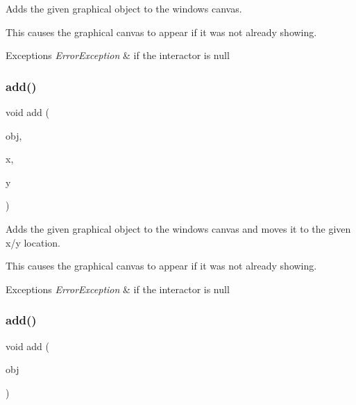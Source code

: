 Adds the given graphical object to the window\textquotesingle{}s canvas. 

This causes the graphical canvas to appear if it was not already showing. 
\begin{DoxyExceptions}{Exceptions}
{\em Error\+Exception} & if the interactor is null \\
\hline
\end{DoxyExceptions}
\mbox{\label{classsgl_1_1GWindow_ab5388ece7a50b46e0ee72e11fe202609}} 
\subsubsection{\texorpdfstring{add()}{add()}\hspace{0.1cm}{\footnotesize\ttfamily [6/8]}}
{\footnotesize\ttfamily void add (\begin{DoxyParamCaption}\item[{\mbox{\hyperlink{classsgl_1_1GObject}{G\+Object}} $\ast$}]{obj,  }\item[{double}]{x,  }\item[{double}]{y }\end{DoxyParamCaption})\hspace{0.3cm}{\ttfamily [virtual]}}



Adds the given graphical object to the window\textquotesingle{}s canvas and moves it to the given x/y location. 

This causes the graphical canvas to appear if it was not already showing. 
\begin{DoxyExceptions}{Exceptions}
{\em Error\+Exception} & if the interactor is null \\
\hline
\end{DoxyExceptions}
\mbox{\label{classsgl_1_1GWindow_a7f596867e2d8f9dfb816b3d496ea074f}} 
\subsubsection{\texorpdfstring{add()}{add()}\hspace{0.1cm}{\footnotesize\ttfamily [7/8]}}
{\footnotesize\ttfamily void add (\begin{DoxyParamCaption}\item[{\mbox{\hyperlink{classsgl_1_1GObject}{G\+Object}} \&}]{obj }\end{DoxyParamCaption})\hspace{0.3cm}{\ttfamily [virtual]}}



